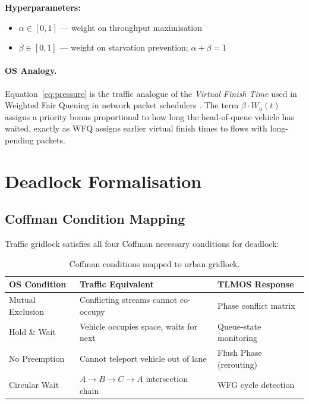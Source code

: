 \documentclass[11pt]{article}
\begin{document}
\textbf{Hyperparameters:}
\begin{itemize}
  \item $\alpha \in [0,1]$ — weight on throughput maximisation
  \item $\beta \in [0,1]$ — weight on starvation prevention; $\alpha + \beta = 1$
\end{itemize}

\paragraph{OS Analogy.}
Equation~\eqref{eq:pressure} is the traffic analogue of the
\emph{Virtual Finish Time} used in Weighted Fair Queuing in network packet
schedulers \cite{demers1989analysis}. The term $\beta \cdot W_u(t)$ assigns a
priority bonus proportional to how long the head-of-queue vehicle has waited,
exactly as WFQ assigns earlier virtual finish times to flows with long-pending packets.

\section{Deadlock Formalisation}

\subsection{Coffman Condition Mapping}

Traffic gridlock satisfies all four Coffman \cite{coffman1971system} necessary
conditions for deadlock:

\begin{table}[h]
\centering
\begin{tabular}{lll}
\toprule
\textbf{OS Condition} & \textbf{Traffic Equivalent} & \textbf{TLMOS Response} \\
\midrule
Mutual Exclusion   & Conflicting streams cannot co-occupy & Phase conflict matrix \\
Hold \& Wait       & Vehicle occupies space, waits for next & Queue-state monitoring \\
No Preemption      & Cannot teleport vehicle out of lane & Flush Phase (rerouting) \\
Circular Wait      & $A \to B \to C \to A$ intersection chain & WFG cycle detection \\
\bottomrule
\end{tabular}
\caption{Coffman conditions mapped to urban gridlock.}
\end{table}
\end{document}
